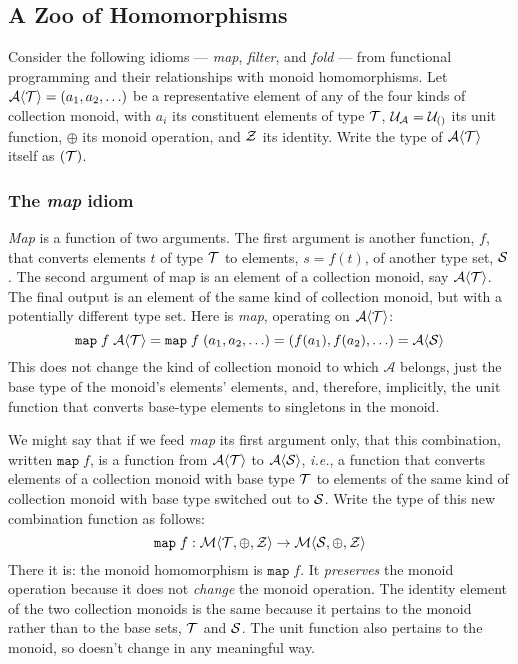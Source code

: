 \subsection{\color{red}A Zoo of Homomorphisms}


Consider the following idioms --- \emph{map}, \emph{filter}, and \emph{fold} --- from functional programming and their relationships with monoid homomorphisms. Let $\mathcal{A}\langle\mathcal{T}\rangle=(a_1,a_2,\ldots)$ be a representative element of any of the four kinds of collection monoid, with $a_{i}$ its constituent elements of type $\mathcal{T}$, $\mathcal{U}_{\mathcal{A}}=\mathcal{U}_{\mathcal{()}}$ its unit function, $\oplus$ its monoid operation, and $\mathcal{Z}$ its identity. Write the type of $\mathcal{A}\langle\mathcal{T}\rangle$ itself as $(\mathcal{T})$. 


\subsubsection{\color{red}The \emph{map} idiom}


\emph{Map} is a function of two arguments. The first argument is another function, $f$, that converts elements $t$ of type $\mathcal{T}$ to elements, $s=f(t)$, of another type set, $\mathcal{S}$. The second argument of map is an element of a collection monoid, say $\mathcal{A}\langle\mathcal{T}\rangle$. The final output is an element of the same kind of collection monoid, but with a potentially different type set. Here is \emph{map}, operating on $\mathcal{A}\langle\mathcal{T}\rangle$:
\[
  \mathtt{map}\;f\;\mathcal{A}\langle\mathcal{T}\rangle= 
  \mathtt{map}\;f\;(a_1,a_2,\ldots) = 
  \left( f(a_1),f(a_2),\ldots\right) = \mathcal{A}\langle\mathcal{S}\rangle
\]
This does not change the kind of collection monoid to which $\mathcal{A}$ belongs, just the base type of the monoid's elements' elements, and, therefore, implicitly, the unit function that converts base-type elements to singletons in the monoid. 

We might say that if we feed \emph{map} its first argument only, that this combination, written $\mathtt{map}\;f$, is a function from $\mathcal{A}\langle\mathcal{T}\rangle$ to $\mathcal{A}\langle\mathcal{S}\rangle$, \emph{i.e.}, a function that converts elements of a collection monoid with base type $\mathcal{T}$ to elements of the same kind of collection monoid with base type switched out to $\mathcal{S}$. Write the type of this new combination function as follows:
\[
  \mathtt{map}\;f:\mathcal{M}\langle{\mathcal{T}},{\oplus},{\mathcal{Z}}\rangle
    \rightarrow\mathcal{M}\langle{\mathcal{S}},{\oplus},{\mathcal{Z}}\rangle
\]
There it is: the monoid homomorphism is $\mathtt{map}\;f$. It \emph{preserves} the monoid operation because it does not \emph{change} the monoid operation. The identity element of the two collection monoids is the same because it pertains to the monoid rather than to the base sets, $\mathcal{T}$ and $\mathcal{S}$. The unit function also pertains to the monoid, so doesn't change in any meaningful way. 

